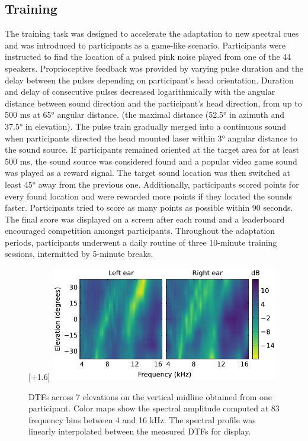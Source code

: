 \subsection{Training}
The training task was designed to accelerate the adaptation to new spectral cues and was introduced to participants as a game-like scenario. Participants were instructed to find the location of a pulsed pink noise played from one of the 44 speakers. Proprioceptive feedback was provided by varying pulse duration and the delay between the pulses depending on participant’s head orientation. Duration and delay of consecutive pulses decreased logarithmically with the angular distance between sound direction and the participant’s head direction, from up to 500 ms at 65° angular distance. (the maximal distance (52.5° in azimuth and 37.5° in elevation). The pulse train gradually merged into a continuous sound when participants directed the head mounted laser within 3° angular distance to the sound source. If participants remained oriented at the target area for at least 500 ms, the sound source was considered found and a popular video game sound was played as a reward signal. The target sound location was then switched at least 45° away from the previous one. Additionally, participants scored points for every found location and were rewarded more points if they located the sounds faster. Participants tried to score as many points as possible within 90 seconds. The final score was displayed on a screen after each round and a leaderboard encouraged competition amongst participants. Throughout the adaptation periods, participants underwent a daily routine of three 10-minute training sessions, intermitted by 5-minute breaks.

\begin{figure}
\centering
\raisebox{0pt}[\dimexpr\height+1.6\baselineskip\relax]{
\includegraphics[width=10cm]{../Results/figures/fig1/fig1}}
\caption{DTFs across 7 elevations on the vertical midline obtained from one participant. Color maps show the spectral amplitude computed at 83 frequency bins between 4 and 16 kHz. The spectral profile was linearly interpolated between the measured DTFs for display.}
\label{fig:ef_l_r}
\end{figure}
\noindent%


